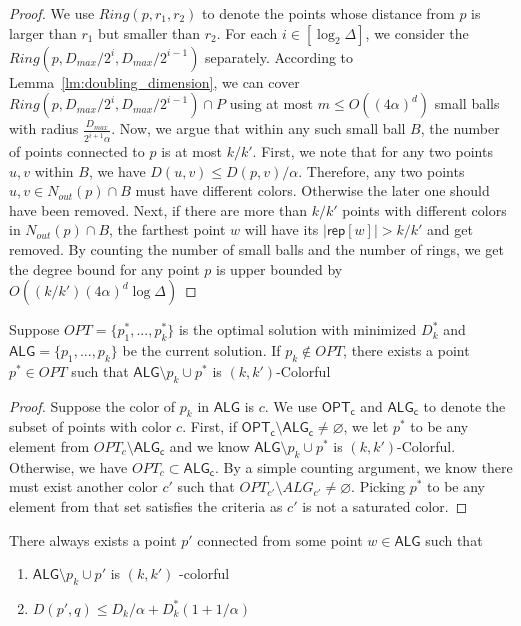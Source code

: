 \begin{proof}
We use $Ring(p,r_1,r_2)$ to denote the points whose distance from $p$ is larger than $r_1$ but smaller than $r_2$. For each $i\in [\log_2 \Delta]$, we consider the $Ring(p,D_{max}/2^i,D_{max}/2^{i-1})$ separately. According to Lemma~\ref{lm:doubling_dimension}, we can cover $Ring(p,D_{max}/2^i,D_{max}/2^{i-1})\cap P$ using at most $m\le O((4\alpha)^d)$ small balls with radius $\frac{D_{max}}{2^{i+1}\alpha}$. Now, we argue that within any such small ball $B$, the number of points connected to $p$ is at most $k/k'$. First, we note that for any two points $u,v$ within $B$, we have $D(u,v)\le D(p,v)/\alpha$. Therefore, any two points $u,v\in N_{out}(p)\cap B$ must have different colors. Otherwise the later one should have been removed. Next, if there are more than $k/k'$ points with different colors in $N_{out}(p)\cap B$, the farthest point $w$ will have its $|\mathsf{rep}[w]|>k/k'$ and get removed. By counting the number of small balls and the number of rings, we get the degree bound for any point $p$ is upper bounded by $O((k/k')(4\alpha)^d\log\Delta)$
\end{proof}

\begin{lemma}\label{lm:p_star_exists_colorful}
Suppose $OPT=\{p^*_1,...,p^*_k\}$ is the optimal solution with minimized $D^*_k$ and $\mathsf{ALG}=\{p_1,...,p_k\}$ be the current solution. If $p_k\notin OPT$, there exists a point $p^* \in OPT$ such that $\mathsf{ALG}\setminus p_k \cup p^*$ is $(k,k')$-Colorful
\end{lemma}

\begin{proof}
Suppose the color of $p_k$ in $\mathsf{ALG}$ is $c$. We use $\mathsf{OPT_c}$ and $\mathsf{ALG_c}$ to denote the subset of points with color $c$. First, if $\mathsf{OPT_c}\setminus \mathsf{ALG_c}\neq \varnothing$, we let $p^*$ to be any element from $OPT_c\setminus \mathsf{ALG_c}$ and we know $\mathsf{ALG}\setminus p_k \cup p^*$ is $(k,k')$-Colorful. Otherwise, we have $OPT_c\subset \mathsf{ALG_c}$. By a simple counting argument, we know there must exist another color $c'$ such that $OPT_
{c'}\setminus ALG_{c'}\neq\varnothing$. Picking $p^*$ to be any element from that set satisfies the criteria as $c'$ is not a saturated color.
\end{proof}

\begin{lemma}\label{lm:update_colorful}
There always exists a point $p'$ connected from some point $w\in \mathsf{ALG}$ such that
\begin{enumerate}
\item $\mathsf{ALG}\setminus p_k\cup p'$ is $(k,k')$ -colorful
\item $D(p',q)\le D_k/\alpha+D^*_k(1+1/\alpha)$
\end{enumerate}
\end{lemma}

